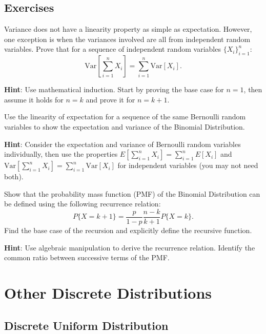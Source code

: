 \subsection{Exercises}
\begin{exercise}
    Variance does not have a linearity property as simple as expectation. However, one exception is when the variances involved are all from independent random variables. Prove that for a sequence of independent random variables $\{X_i\}_{i=1}^n$:
    \[\text{Var}\left[\sum_{i=1}^{n} X_i\right] = \sum_{i=1}^{n} \text{Var}[X_i].\]
    
    \noindent \textbf{Hint}: Use mathematical induction. Start by proving the base case for $n=1$, then assume it holds for $n=k$ and prove it for $n=k+1$.
\end{exercise}

\begin{exercise}
    Use the linearity of expectation for a sequence of the same Bernoulli random variables to show the expectation and variance of the Binomial Distribution.
    
    \noindent \textbf{Hint}: Consider the expectation and variance of Bernoulli random variables individually, then use the properties $E\left[\sum_{i=1}^n X_i\right] = \sum_{i=1}^n E[X_i]$ and $\text{Var}\left[\sum_{i=1}^n X_i\right] = \sum_{i=1}^n \text{Var}[X_i]$ for independent variables (you may not need both).
\end{exercise}

\begin{exercise}
    Show that the probability mass function (PMF) of the Binomial Distribution can be defined using the following recurrence relation:
    \[P\{X = k+1\} = \frac{p}{1-p} \frac{n-k}{k+1} P\{X = k\}.\]
    Find the base case of the recursion and explicitly define the recursive function.
    
    \noindent \textbf{Hint}: Use algebraic manipulation to derive the recurrence relation. Identify the common ratio between successive terms of the PMF.
\end{exercise}




\section{Other Discrete Distributions}
\subsection{Discrete Uniform Distribution}
